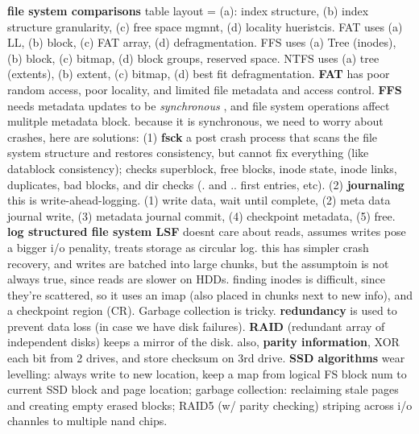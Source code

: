 
{\bf file system comparisons} table layout = (a): index structure, (b) index
structure granularity, (c) free space mgmnt, (d) locality hueristcis.  FAT uses
(a) LL, (b) block, (c) FAT array, (d) defragmentation.  FFS uses (a) Tree
(inodes), (b) block, (c) bitmap, (d) block groups, reserved space.  NTFS uses
(a) tree (extents), (b) extent, (c) bitmap, (d) best fit defragmentation.  {\bf
FAT} has poor random access, poor locality, and limited file metadata and
access control.  
{\bf FFS} needs metadata updates to be {\it synchronous }, and
file system operations affect mulitple metadata block.  because it is
synchronous, we need to worry about crashes, here are solutions: (1) {\bf fsck}
a post crash process that scans the file system structure and restores
consistency, but cannot fix everything (like datablock consistency); checks
superblock, free blocks, inode state, inode links, duplicates, bad blocks, and
dir checks (. and .. first entries, etc). (2) {\bf journaling} this is
write-ahead-logging. (1) write data, wait until complete, (2) meta data journal
write, (3) metadata journal commit, (4) checkpoint metadata, (5) free. 
{\bf log structured file system LSF} doesnt care about reads, assumes writes
pose a bigger i/o penality, treats storage as circular log. this has simpler
crash recovery, and writes are batched into large chunks, but the assumptoin is
not always true, since reads are slower on HDDs. finding inodes is difficult,
since they're scattered, so it uses an imap (also placed in chunks next to new
info), and a checkpoint region (CR). Garbage collection is tricky. 
{\bf redundancy} is used to prevent data loss (in case we have disk failures). {\bf RAID} (redundant array of independent disks) keeps a mirror of the disk. also, {\bf parity information}, XOR each bit from 2 drives, and store checksum on 3rd drive.
{\bf SSD algorithms} wear levelling: always write to new location, keep a map from logical FS block num to current SSD block and page location; garbage collection: reclaiming stale pages and creating empty erased blocks; RAID5 (w/ parity checking) striping across i/o channles to multiple nand chips.
